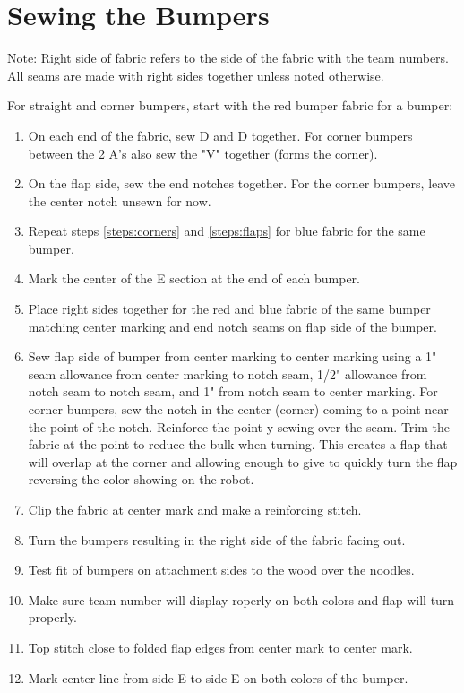 \documentclass[
10pt, %
a4paper, %
oneside, %
headinclude,footinclude, %
BCOR5mm, %
]{scrartcl}
\begin{document}
\section{Sewing the Bumpers}

Note: Right side of fabric refers to the side of the fabric with the team numbers. All seams are made with right sides together unless noted otherwise.

For straight and corner bumpers, start with the red bumper fabric for a bumper:
\begin{enumerate}
	\item On each end of the fabric, sew D and D together. For corner bumpers between the 2 A's also sew the "V" together (forms the corner). \label{steps:corners}
	\item On the flap side, sew the end notches together. For the corner bumpers, leave the center notch unsewn for now. \label{steps:flaps}
	\item Repeat steps \ref{steps:corners} and \ref{steps:flaps} for blue fabric for the same bumper.
	\item Mark the center of the E section at the end of each bumper.
	\item Place right sides together for the red and blue fabric of the same bumper matching center marking and end notch seams on flap side of the bumper.
	\item Sew flap side of bumper from center marking to center marking using a 1" seam allowance from center marking to notch seam, 1/2" allowance from notch seam to notch seam, and 1" from notch seam to center marking. For corner bumpers, sew the notch in the center (corner) coming to a point near the point of the notch. Reinforce the point y sewing over the seam. Trim the fabric at the point to reduce the bulk when turning. This creates a flap that will overlap at the corner and allowing enough to give to quickly turn the flap reversing the color showing on the robot.
	\item Clip the fabric at center mark and make a reinforcing stitch.
	\item Turn the bumpers resulting in the right side of the fabric facing out.
	\item Test fit of bumpers on attachment sides to the wood over the noodles.
	\item Make sure team number will display roperly on both colors and flap will turn properly.
	\item Top stitch close to folded flap edges from center mark to center mark.
	\item Mark center line from side E to side E on both colors of the bumper.

\end{enumerate}
\end{document}
